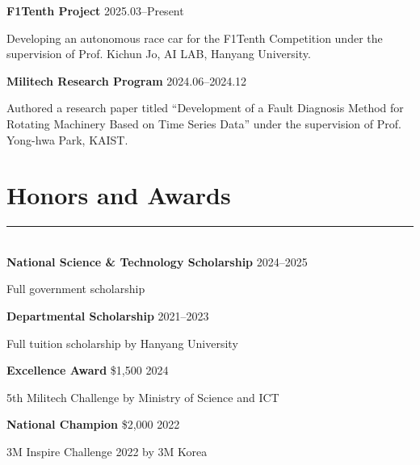 \documentclass[11pt,a4paper]{article}
\newcommand{\sectionrule}{\vspace{-0.4em}\noindent\rule{\textwidth}{0.4pt}\\[0.3em]}
\begin{document}
\noindent\textbf{F1Tenth Project} \hfill 2025.03--Present \\[-1.25em]
\begin{adjustwidth}{2em}{0em}
Developing an autonomous race car for the F1Tenth Competition under the supervision of Prof. Kichun Jo, AI LAB, Hanyang University. \\
\end{adjustwidth}


\noindent\textbf{Militech Research Program} \hfill 2024.06--2024.12 \\[-1.25em]
\begin{adjustwidth}{2em}{0em}
Authored a research paper titled ``Development of a Fault Diagnosis Method for Rotating Machinery Based on Time Series Data'' under the supervision of Prof. Yong-hwa Park, KAIST. \\
\end{adjustwidth}

\vspace{0.15cm}

\section*{Honors and Awards}\vspace{-1.0em}\sectionrule
\textbf{National Science \& Technology Scholarship} \hfill 2024--2025 \\[-1.25em]
\begin{adjustwidth}{2em}{0em}
Full government scholarship \\
\end{adjustwidth}

\noindent\textbf{Departmental Scholarship} \hfill 2021--2023 \\[-1.25em]
\begin{adjustwidth}{2em}{0em}
Full tuition scholarship by Hanyang University \\
\end{adjustwidth}

\noindent\textbf{Excellence Award} \textcolor{gray!50!black}{\$1,500} \hfill 2024 \\[-1.25em]
\begin{adjustwidth}{2em}{0em}
5th Militech Challenge by Ministry of Science and ICT \\
\end{adjustwidth}

\noindent\textbf{National Champion} \textcolor{gray!50!black}{\$2,000} \hfill 2022 \\[-1.25em]
\begin{adjustwidth}{2em}{0em}
3M Inspire Challenge 2022 by 3M Korea \\
\end{adjustwidth}
\end{document}
